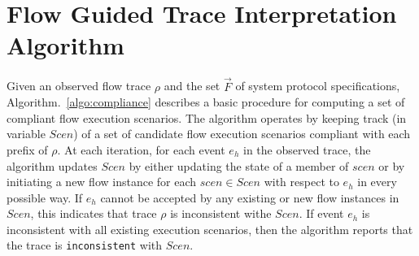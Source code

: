 \documentclass[12pt,frontmatter,copyright,thesis]{usfmanus}
\begin{document}
\section{Flow Guided Trace Interpretation Algorithm}
Given an observed flow trace $\rho$ and the set $\vec{F}$ of system protocol specifications,
Algorithm.~\ref{algo:compliance} describes a basic procedure for
computing a set of compliant flow execution scenarios. 
The algorithm operates by keeping track (in variable
$\mathit{Scen}$) of a set of candidate flow execution scenarios
compliant with each prefix of $\rho$.  At each iteration,
for each event $e_h$ in the observed trace, the algorithm
updates $Scen$ by either updating the state of a member of
$\mathit{scen}$ or by initiating a new flow instance for 
each $scen \in Scen$ with respect to $e_h$ in every possible way.
If $e_h$ cannot be accepted by any existing or new flow instances in $Scen$,
this indicates that trace $\rho$ is inconsistent withe $Scen$.
If event $e_h$ is inconsistent with all existing execution scenarios,
then the algorithm reports that the trace is {\tt  inconsistent} with $\mathit{Scen}$.
 
\end{document}
